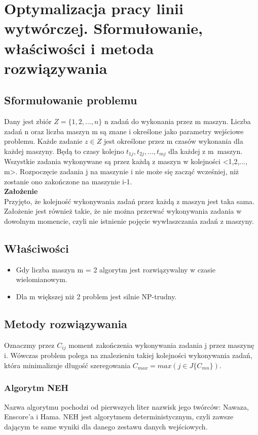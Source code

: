 \documentclass[10pt, a
4paper]{article}
\begin{document}
\newpage
\section{Optymalizacja pracy linii wytwórczej. Sformułowanie, właściwości i metoda rozwiązywania}
\subsection{Sformułowanie problemu}
Dany jest zbiór $Z = \{1,2, ... ,n\}$ n zadań do wykonania przez m maszyn. Liczba zadań n oraz liczba maszyn m są znane i określone jako parametry wejściowe problemu. Każde zadanie $z \in Z$ jest określone przez m czasów wykonania dla każdej maszyny. Będą to czasy kolejno $t_{1j},t_{2j}, ..., t_{mj}$ dla każdej z m~maszyn. Wszystkie zadania wykonywane są przez każdą z maszyn w kolejności <1,2,..., m>. Rozpoczęcie zadania j na maszynie i nie może się zacząć wcześniej, niż zostanie ono zakończone na maszynie i-1.\\
\noindent \textbf{Założenie}\\
 Przyjęto, że kolejność wykonywania zadań przez każdą z maszyn jest taka sama. Założenie jest również takie, że nie można przerwać wykonywania zadania w dowolnym momencie, czyli nie istnienie pojęcie wywłaszczania zadań z maszyny.
 
\subsection{Właściwości}
\begin{itemize}
\item Gdy liczba maszyn m = 2 algorytm jest rozwiązywalny w czasie wielomianowym. 
\item Dla m większej niż 2 problem jest silnie NP-trudny.
\end{itemize}

\subsection{Metody rozwiązywania}
Oznaczmy przez $C_{ij}$ moment zakończenia wykonywania zadania j przez maszynę i. Wówczas problem polega na znalezieniu takiej kolejności wykonywania zadań, która minimalizuje długość szeregowania $C_{max} = max( j \in J\{C_{mn}\})$.

\subsubsection{Algorytm NEH}
Nazwa algorytmu pochodzi od pierwszych
liter nazwisk jego twórców: Nawaza, Enscore'a i Hama. NEH jest algorytmem
deterministycznym, czyli zawsze dającym te same wyniki dla danego zestawu
danych wejściowych.
 
\end{document}
